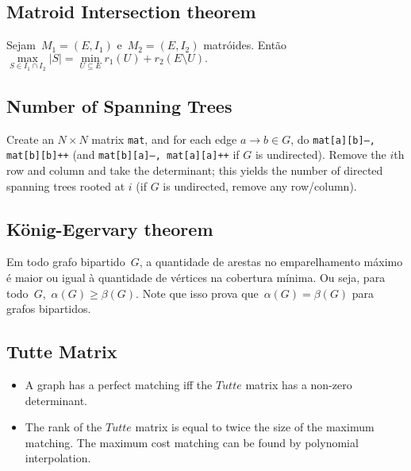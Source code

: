 \subsection{Matroid Intersection theorem}
Sejam~$M_1 = (E, I_1)$ e~$M_2 = (E, I_2)$ matróides. Então
$ \max\limits_{S \in I_1 \cap I_2}{|S|} = \min\limits_{U \subseteq E}{r_1(U) + r_2(E \setminus U)}.$

\subsection{Number of Spanning Trees}
		Create an $N\times N$ matrix \texttt{mat}, and for each edge $a \rightarrow b \in G$, do
		\texttt{mat[a][b]--, mat[b][b]++} (and \texttt{mat[b][a]--, mat[a][a]++} if $G$ is undirected).
		Remove the $i$th row and column and take the determinant; this yields the number of directed spanning trees rooted at $i$
		(if $G$ is undirected, remove any row/column).\newline

\subsection{König-Egervary theorem}
    Em todo grafo bipartido~$G$, a quantidade de arestas no emparelhamento máximo é maior ou igual à quantidade de vértices na cobertura mínima. Ou seja, para todo~$G$,~$\alpha(G) \geq \beta(G)$. Note que isso prova que~$\alpha(G) = \beta(G)$ para grafos bipartidos.

\subsection{Tutte Matrix}
	\begin{itemize}
	\item A graph has a perfect matching iff the $Tutte$ matrix has a non-zero determinant.

	\item The rank of the $Tutte$ matrix is equal to twice the size of the maximum matching. The maximum cost matching can be found by polynomial interpolation.
	\end{itemize}
